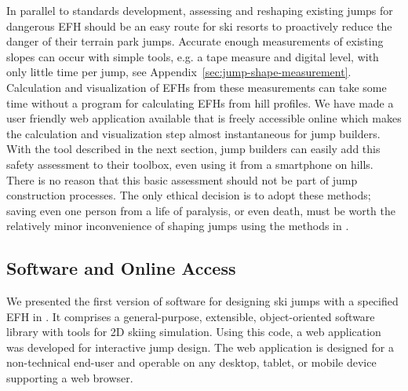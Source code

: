 \documentclass[smallextended]{svjour3}       %
\begin{document}
In parallel to standards development, assessing and reshaping existing jumps
for dangerous EFH should be an easy route for ski resorts to proactively reduce
the danger of their terrain park jumps. Accurate enough measurements of
existing slopes can occur with simple tools, e.g. a tape measure and digital
level, with only little time per jump, see
Appendix~\ref{sec:jump-shape-measurement}. Calculation and visualization of
EFHs from these measurements can take some time without a program for
calculating EFHs from hill profiles. We have made a user friendly web
application available that is freely accessible online which makes the
calculation and visualization step almost instantaneous for jump builders. With
the tool described in the next section, jump builders can easily add this
safety assessment to their toolbox, even using it from a smartphone on hills.
There is no reason that this basic assessment should not be part of jump
construction processes. The only ethical decision is to adopt these methods;
saving even one person from a life of paralysis, or even death, must be worth
the relatively minor inconvenience of shaping jumps using the methods in
\cite{Levy2015}.


\subsection{Software and Online Access}
\label{sec:software}
%
We presented the first version of software for designing ski jumps with a
specified EFH in \cite{Moore2018}. It comprises
a general-purpose, extensible, object-oriented software library with tools for
2D skiing simulation. Using this code, a web application was developed
for interactive jump design. The web application is designed for a
non-technical end-user and operable on any desktop, tablet, or mobile device
supporting a web browser.
\end{document}
